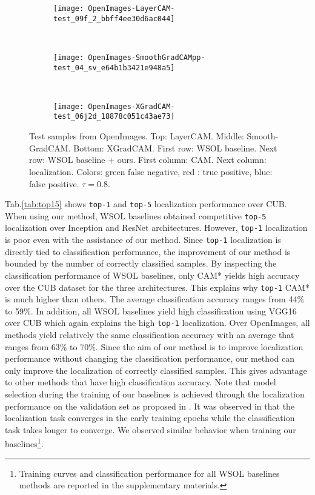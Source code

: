 \documentclass[twocolumn]{article}
\newcommand\topone{\texttt{top-1}\xspace}
\newcommand\topfive{\texttt{top-5}\xspace}
\theoremstyle{definition}
\begin{document}
\begin{figure}
     \centering
     \begin{subfigure}[b]{0.45\textwidth}
         \centering
         \texttt{[image: OpenImages-LayerCAM-test\_09f\_2\_bbff4ee30d6ac044]}
     \end{subfigure}
     \\
     \vspace{.2cm}
     \begin{subfigure}[b]{0.45\textwidth}
         \centering
         \texttt{[image: OpenImages-SmoothGradCAMpp-test\_04\_sv\_e64b1b3421e948a5]}
     \end{subfigure}
     \\
     \vspace{.2cm}
     \begin{subfigure}[b]{0.45\textwidth}
         \centering
         \texttt{[image: OpenImages-XGradCAM-test\_06j2d\_18878c051c43ae73]}
     \end{subfigure}
        \caption{Test samples from OpenImages. Top: LayerCAM. Middle: Smooth-GradCAM. Bottom: XGradCAM. First row: WSOL baseline. Next row: WSOL baseline + ours. First column: CAM. Next column: localization. Colors: green false negative, red : true positive, blue: false positive. ${\tau=0.8}$.}
        \label{fig:mainvisuopenimages}
\end{figure}


Tab.\ref{tab:top15} shows \topone and \topfive localization performance over CUB. When using our method, WSOL baselines obtained competitive \topfive localization over Inception and ResNet architectures. However, \topone localization is poor even with the assistance of our method. Since \topone localization is directly tied to classification performance, the improvement of our method is bounded by the number of correctly classified samples. By inspecting the classification performance of WSOL baselines, only CAM* yields high accuracy over the CUB dataset for the three architectures. This explains why \topone CAM* is much higher than others. The average classification accuracy ranges from 44\% to 59\%. In addition, all WSOL baselines yield high classification using VGG16 over CUB which again explains the high \topone localization. Over OpenImages, all methods yield relatively the same classification accuracy with an average that ranges from 63\% to 70\%.
Since the aim of our method is to improve localization performance without changing the classification performance, our method can only improve the localization of correctly classified samples. This gives advantage to other methods that have high classification accuracy. Note that model selection during the training of our baselines is achieved through the localization performance on the validation set as proposed in \cite{choe2020evaluating}. It was observed in \cite{choe2020evaluating} that the localization task converges in the early training epochs while the classification task takes longer to converge. We observed similar behavior when training our baselines\footnote{Training curves and classification performance for all WSOL baselines methods are reported in the supplementary materials.}.
\end{document}
